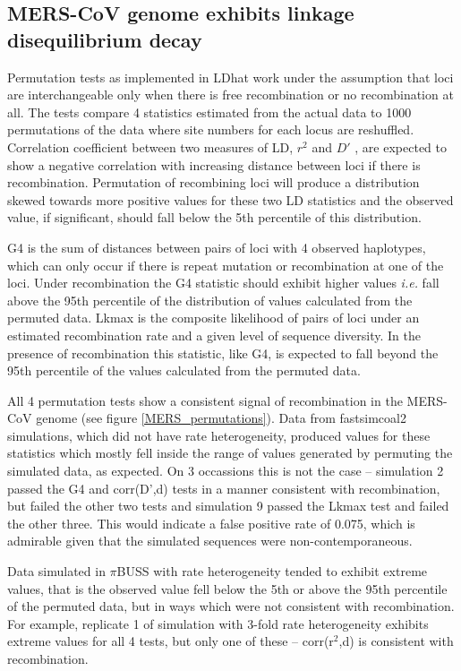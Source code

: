 \documentclass[11pt,oneside,letterpaper]{article}
\begin{document}
\subsection*{MERS-CoV genome exhibits linkage disequilibrium decay}
Permutation tests as implemented in LDhat work under the assumption that loci are interchangeable only when there is free recombination or no recombination at all.
The tests compare 4 statistics estimated from the actual data to 1000 permutations of the data where site numbers for each locus are reshuffled.
Correlation coefficient between two measures of LD, $r^{2}$ \citep{hill_1968} and $D'$ \citep{lewontin_1964}, are expected to show a negative correlation with increasing distance between loci if there is recombination.
Permutation of recombining loci will produce a distribution skewed towards more positive values for these two LD statistics and the observed value, if significant, should fall below the 5th percentile of this distribution.

G4 is the sum of distances between pairs of loci with 4 observed haplotypes, which can only occur if there is repeat mutation or recombination at one of the loci.
Under recombination the G4 statistic should exhibit higher values \textit{i.e.} fall above the 95th percentile of the distribution of values calculated from the permuted data.
Lkmax is the composite likelihood of pairs of loci under an estimated recombination rate and a given level of sequence diversity.
In the presence of recombination this statistic, like G4, is expected to fall beyond the 95th percentile of the values calculated from the permuted data.

All 4 permutation tests show a consistent signal of recombination in the MERS-CoV genome (see figure \ref{MERS_permutations}).
Data from fastsimcoal2 simulations, which did not have rate heterogeneity, produced values for these statistics which mostly fell inside the range of values generated by permuting the simulated data, as expected.
On 3 occassions this is not the case -- simulation 2 passed the G4 and corr(D',d) tests in a manner consistent with recombination, but failed the other two tests and simulation 9 passed the Lkmax test and failed the other three.
This would indicate a false positive rate of 0.075, which is admirable given that the simulated sequences were non-contemporaneous.

Data simulated in $\pi$BUSS with rate heterogeneity tended to exhibit extreme values, that is the observed value fell below the 5th or above the 95th percentile of the permuted data, but in ways which were not consistent with recombination.
For example, replicate 1 of simulation with 3-fold rate heterogeneity exhibits extreme values for all 4 tests, but only one of these -- corr(r$^{2}$,d) is consistent with recombination.
\end{document}
